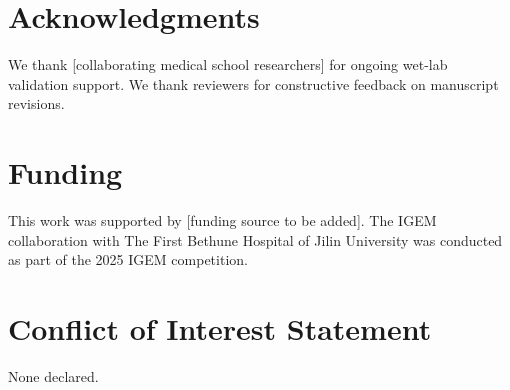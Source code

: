 \documentclass[11pt,a4paper]{article}
\begin{document}
\section{Acknowledgments}

We thank [collaborating medical school researchers] for ongoing wet-lab validation support. We thank reviewers for constructive feedback on manuscript revisions.

\section{Funding}

This work was supported by [funding source to be added]. The IGEM collaboration with The First Bethune Hospital of Jilin University was conducted as part of the 2025 IGEM competition.

\section{Conflict of Interest Statement}

None declared.


\end{document}
